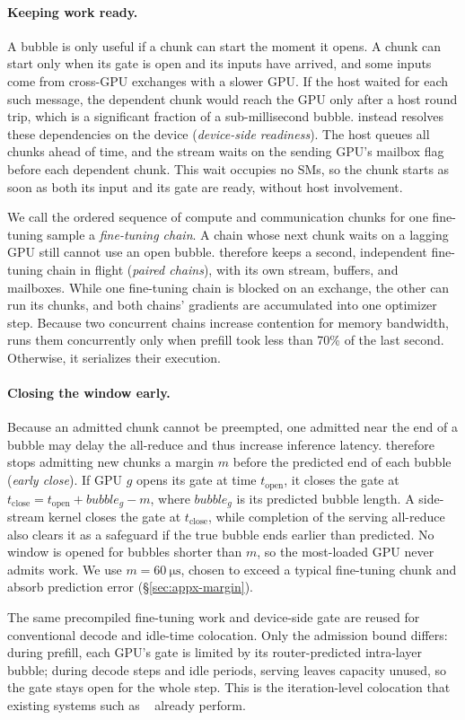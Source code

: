 \paragraph{Keeping work ready.}
\label{sec:design-chunk}
A bubble is only useful if a chunk can start the moment it opens.
A chunk can start only when its gate is open and its inputs have arrived, and some inputs come from cross-GPU exchanges with a slower GPU.
If the host waited for each such message, the dependent chunk would reach the GPU only after a host round trip, which is a significant fraction of a sub-millisecond bubble.
\sys instead resolves these dependencies on the device (\emph{device-side readiness}).
The host queues all chunks ahead of time, and the stream waits on the sending GPU's mailbox flag before each dependent chunk.
This wait occupies no SMs, so the chunk starts as soon as both its input and its gate are ready, without host involvement.

We call the ordered sequence of compute and communication chunks for one fine-tuning sample a \emph{fine-tuning chain}.
A chain whose next chunk waits on a lagging GPU still cannot use an open bubble.
\sys therefore keeps a second, independent fine-tuning chain in flight (\emph{paired chains}), with its own stream, buffers, and mailboxes.
While one fine-tuning chain is blocked on an exchange, the other can run its chunks, and both chains' gradients are accumulated into one optimizer step.
Because two concurrent chains increase contention for memory bandwidth, \sys runs them concurrently only when prefill took less than 70\% of the last second.
Otherwise, it serializes their execution.

\paragraph{Closing the window early.}
\label{sec:design-optC}
Because an admitted chunk cannot be preempted, one admitted near the end of a bubble may delay the all-reduce and thus increase inference latency.
\sys therefore stops admitting new chunks a margin $m$ before the predicted end of each bubble (\emph{early close}).
If GPU $g$ opens its gate at time $t_{\mathrm{open}}$, it closes the gate at $t_{\mathrm{close}} = t_{\mathrm{open}} + \mathit{bubble}_g - m $, where $\mathit{bubble}_g$ is its predicted bubble length.
A side-stream kernel closes the gate at $t_{\mathrm{close}}$, while completion of the serving all-reduce also clears it as a safeguard if the true bubble ends earlier than predicted.
No window is opened for bubbles shorter than $m$, so the most-loaded GPU never admits work.
We use $m=\SI{60}{\micro\second}$, chosen to exceed a typical fine-tuning chunk and absorb prediction error (\S\ref{sec:appx-margin}).

The same precompiled fine-tuning work and device-side gate are reused for conventional decode and idle-time colocation.
Only the admission bound differs: during prefill, each GPU's gate is limited by its router-predicted intra-layer bubble; during decode steps and idle periods, serving leaves capacity unused, so the gate stays open for the whole step.
This is the iteration-level colocation that existing systems such as \llmstation~\cite{llmstation} already perform.
